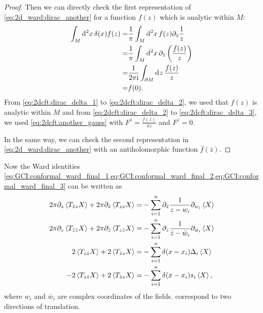 \documentclass[10pt]{article}
\newcommand{\ii}{\mathrm{i}}
\begin{document}
\begin{proof}
    Then we can directly check the first representation of \cref{eq:2d_ward:dirac_another} for a function $f(z)$ which is analytic within $M$:
    \begin{subequations}
        \begin{align}
            \int_M \dd[2]{x}\delta(x)f(z)= & \frac{1}{\pi}\int_M\dd[2]{x}f(z)\partial_{\bar{z}}\frac{1}{z}\label{eq:2dcft:dirac_delta_1}             \\
            =                              & \frac{1}{\pi}\int_M\dd[2]{x}\partial_{\bar{z}}\left(\frac{f(z)}{z}\right)\label{eq:2dcft:dirac_delta_2} \\
            =                              & \frac{1}{2\pi \ii}\int_{\partial M}\dd[]{z}\frac{f(z)}{z}\label{eq:2dcft:dirac_delta_3}                 \\
            =                              & f(0).\notag
        \end{align}
    \end{subequations}
    From \cref{eq:2dcft:dirac_delta_1} to \cref{eq:2dcft:dirac_delta_2}, we used that $f(z)$ is analytic within $M$ and from \cref{eq:2dcft:dirac_delta_2} to \cref{eq:2dcft:dirac_delta_3}, we used \cref{eq:2dcft:another_gauss} with $F^{\bar{z}}=\frac{f(z)}{\pi z}$ and $F^z=0$.

    In the same way, we can check the second representation in \cref{eq:2d_ward:dirac_another} with an antiholomorphic function $\bar{f}(\bar{z})$.
\end{proof}
Now the Ward identities \cref{eq:GCI:conformal_ward_final_1,eq:GCI:conformal_ward_final_2,eq:GCI:conformal_ward_final_3} can be written as
\begin{subequations}
    \begin{align}
        2\pi\partial_z\expval{T_{\bar{z}z}X}+2\pi\partial_{\bar{z}}\expval{T_{zz}X}=             & -\sum_{i=1}^n\partial_{\bar{z}}\frac{1}{z-w_i}\partial_{w_i}\expval{X}\label{eq:2dcft:ward_holo_1}           \\
        2\pi\partial_z\expval{T_{\bar{z}\bar{z}}X}+2\pi\partial_{\bar{z}}\expval{T_{z\bar{z}}X}= & -\sum_{i=1}^n\partial_z\frac{1}{\bar{z}-\bar{w}_i}\partial_{\bar{w}_i}\expval{X}\label{eq:2dcft:ward_holo_2} \\
        2\expval{T_{z\bar{z}}X}+2\expval{T_{\bar{z}z}X}=                                         & -\sum_{i=1}^n\delta(x-x_i)\Delta_i\expval{X}\label{eq:2dcft:ward_holo_3}                                     \\
        -2\expval{T_{z\bar{z}}X}+2\expval{T_{\bar{z}z}X}=                                        & -\sum_{i=1}^n\delta(x-x_i)s_i\expval{X},\label{eq:2dcft:ward_holo_4}
    \end{align}
\end{subequations}
where $w_i$ and $\bar{w}_i$ are complex coordinates of the fields.
 correspond to two directions of translation.
\end{document}

